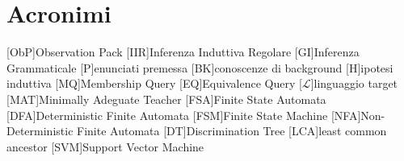 %
%
\chapter*{Acronimi}
\begin{acronym}[WYSIWYM]
[ObP]{Observation Pack}
[IIR]{Inferenza Induttiva Regolare}
[GI]{Inferenza Grammaticale}
[P]{enunciati premessa}
[BK]{conoscenze di background}
[H]{ipotesi induttiva}
[MQ]{Membership Query}
[EQ]{Equivalence Query}
[$\mathcal{L}$]{linguaggio target}
[MAT]{Minimally Adeguate Teacher}
[FSA]{Finite State Automata}
[DFA]{Deterministic Finite Automata}
[FSM]{Finite State Machine}
[NFA]{Non-Deterministic Finite Automata}
[DT]{Discrimination Tree}
[LCA]{least common ancestor}
[SVM]{Support Vector Machine}
\end{acronym}